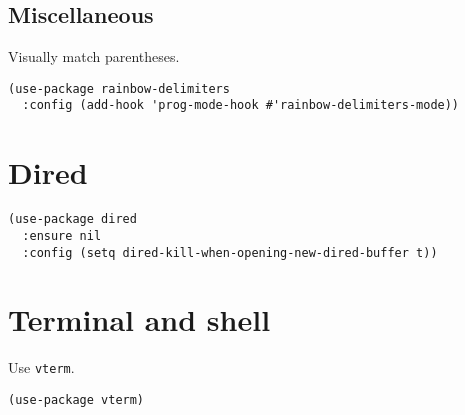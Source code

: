 \documentclass[11pt]{article}
\begin{document}
\subsection{Miscellaneous}
\label{sec:org32d6b46}
Visually match parentheses.
\begin{verbatim}
(use-package rainbow-delimiters
  :config (add-hook 'prog-mode-hook #'rainbow-delimiters-mode))
\end{verbatim}

\section{Dired}
\label{sec:orgc25696b}
\begin{verbatim}
(use-package dired
  :ensure nil
  :config (setq dired-kill-when-opening-new-dired-buffer t))
\end{verbatim}

\section{Terminal and shell}
\label{sec:org37121a4}
Use \texttt{vterm}.
\begin{verbatim}
(use-package vterm)
\end{verbatim}
\end{document}
